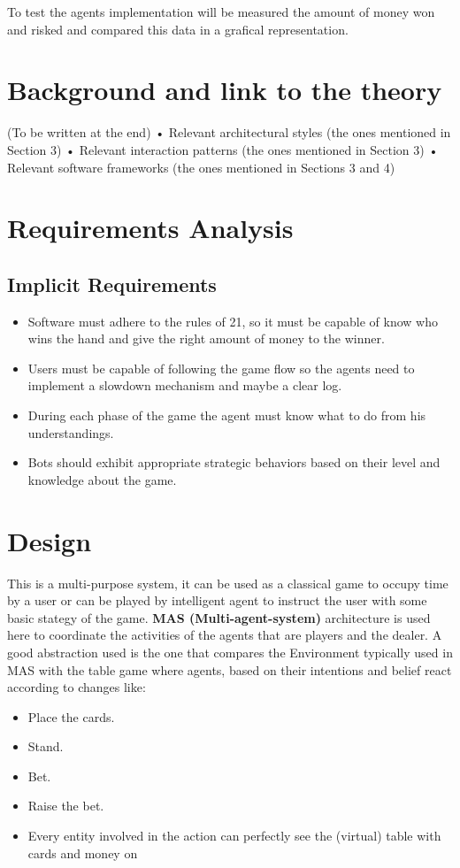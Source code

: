 To test the agents implementation will be measured the amount of money won and risked and compared this data in a grafical representation.

\chapter{Background and link to the theory}

(To be written at the end)
• Relevant architectural styles (the ones mentioned in Section 3)
• Relevant interaction patterns (the ones mentioned in Section 3)
• Relevant software frameworks (the ones mentioned in Sections 3 and 4)


\chapter{Requirements Analysis}

\section{Implicit Requirements}
\begin{itemize}
   \item Software must adhere to the rules of 21, so it must be capable of know who wins the hand and give the right amount of money to the winner.
   \item Users must be capable of following the game flow so the agents need to implement a slowdown mechanism and maybe a clear log.
   \item During each phase of the game the agent must know what to do from his understandings.
   \item Bots should exhibit appropriate strategic behaviors based on their level and knowledge about the game.
\end{itemize}

\chapter{Design}

This is a multi-purpose system, it can be used as a classical game to occupy time by a user or can be played by intelligent agent to instruct the user with some basic stategy of the game. \textbf{MAS (Multi-agent-system)} architecture is used here to coordinate the activities of the agents that are players and the dealer. A good abstraction used is the one that compares the Environment typically used in MAS with the table game where agents, based on their intentions and belief react according to changes like: 
\begin{itemize}
    \item Place the cards.
    \item Stand.
    \item Bet.
    \item Raise the bet.
    \item Every entity involved in the action can perfectly see the (virtual) table with cards and money on
 \end{itemize}

